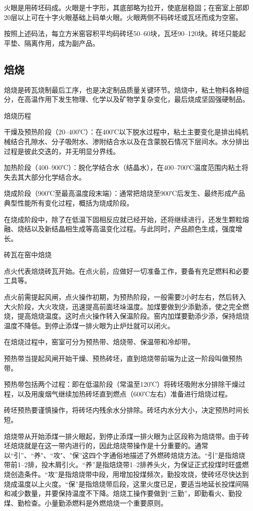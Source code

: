 \documentclass{ctexbook}
\begin{document}
火眼是用砖坯码成。火眼是十字形，其底部略为拉开，使底层稳固；在窑室上部即20层以上可在十字火眼基础上码单火眼。火眼两侧不码砖坯或瓦坯而成为空窑。

按照上述码法，每立方米窑容积平均码砖坯50--60块，瓦坯90--120块。砖坯只能起平垫、隔离作用，成为副产品。
\subsection{焙烧}
焙烧是砖瓦烧制最后工序，也是决定制品质量关键环节。焙烧中，粘土物料各种组分，在高温作用下发生物理、化学以及矿物学复杂变化，最后烧成坚固强硬制品。

焙烧历程

干燥及预热阶段（20--400℃）：在400℃以下脱水过程中，粘土主要变化是排出纯机械结合孔隙水、分子吸附水、渗附结合水以及在含蒙脱石情况下层间水。水分排出过程是彼此交迭的，并无明显分界线。

加热阶段（400--900℃）：脱化学结合水（结晶水），在400--700℃温度范围内粘土将失去其大部分化学结合水。

烧成阶段（900℃至最高温度段末端）：通常把焙烧至900℃后发生、最终形成产品典型性能所有变化过程，概括为烧成阶段。

在烧成阶段中，除了在低温下固相反应就已经开始，还将继续进行，还发生颗粒熔融、烧结以及新结晶相生成等高温变化过程。与此同时，产品颜色生成，强度增长。

砖瓦在窑中焙烧

点火代表焙烧砖瓦开始。在点火前，应做好一切准备工作，要备有充足燃料和必要工具等。

点火前需提起风闸，点火操作初期，为预热阶段，一般需要2小时左右，然后转入大火阶段，大火攻烧，迅速提高前面坯垛温度。加煤要做到少添勤添，使之完全燃烧，提高焙烧温度。这时点火操作转入保温阶段。窑内加煤要勤添少添，保持焙烧温度不降低。到停止添煤一排火眼为止炉灶就可以闭火。

在焙烧过程中，窑室可分为预热带、焙烧带、保温带和冷却带。

预热带当提起风闸开始干燥、预热砖坯，直到焙烧带前端为止这一阶段叫做预热带。

预热带包括两个过程：即在低温阶段（常温至120℃）将砖坯吸附水分排除干燥过程，以及用废烟气继续加热砖坯直到燃点（600℃左右）准备进行焙烧过程。

砖坯预热要谨慎操作，将砖坯内残余水分排除。砖坯内水分大小，决定预热时间长短。

焙烧带从开始添煤一排火眼起，到停止添煤一排火眼为止区段称为焙烧带。由于砖坯焙烧就是在这一带内进行的，因此焙烧带操作是十分重要的。通常以“引”、“养"、“攻"、"保”这四个字通俗地描述了外燃砖焙烧方法。“引”是指焙烧带前1--2排，投木屑引火。“养”是指焙烧带1--2排养头火，为保证正式投煤时旺盛燃烧创造条件。“攻”是指焙烧带中段，用增加投煤频次，勤投攻烧，使砖坯尽快达到烧成温度以上火度。“保”是指焙烧带后段，这里火度已足，要适当地延长投煤间隔和减少数量，并要保持温度不下降。焙烧工操作要做到“三勤”，即勤看火、勤投煤、勤检查。小量勤添燃料是外燃焙烧一个重要原则。
\end{document}
